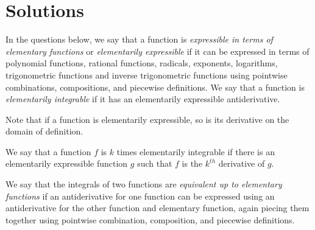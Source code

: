\documentclass[10pt]{amsart}
\begin{document}
\section{Solutions}

In the questions below, we say that a function is {\em expressible in
terms of elementary functions} or {\em elementarily expressible} if it
can be expressed in terms of polynomial functions, rational functions,
radicals, exponents, logarithms, trigonometric functions and inverse
trigonometric functions using pointwise combinations, compositions,
and piecewise definitions. We say that a function is {\em elementarily
integrable} if it has an elementarily expressible antiderivative.

Note that if a function is elementarily expressible, so is its
derivative on the domain of definition.

We say that a function $f$ is $k$ times elementarily integrable if
there is an elementarily expressible function $g$ such that $f$ is the
$k^{th}$ derivative of $g$.

We say that the integrals of two functions are {\em equivalent up to
elementary functions} if an antiderivative for one function can be
expressed using an antiderivative for the other function and
elementary function, again piecing them together using pointwise
combination, composition, and piecewise definitions.
\end{document}
